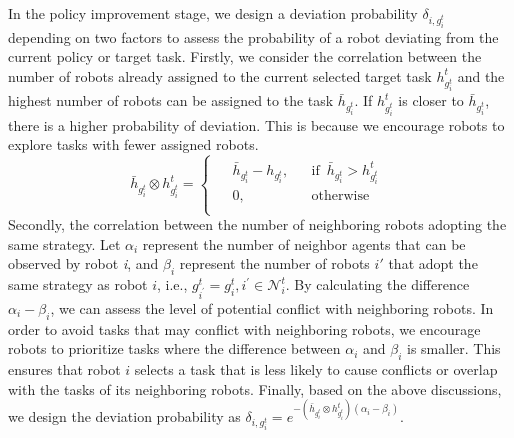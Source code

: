 \documentclass[lettersize,journal]{IEEEtran}
\begin{document}
In the policy improvement stage, we design a deviation probability $\delta_{i,g_i^t}$  depending on two factors to assess the probability of a robot deviating from the current policy or target task. 
  Firstly, we consider the correlation between the number of robots already assigned to the current selected target task $h_{g_i^t}^t$ and the highest number of robots can be assigned to the task $\bar{h}_{g_i^t}$. If $h_{g_i^t}^t$ is closer to $\bar{h}_{g_i^t}$, there is a higher probability of deviation. This is because we encourage robots to explore tasks with fewer assigned robots.
\begin{equation}
    \bar{h}_{g_i^t}\otimes h_{g_i^t}^t=
    \begin{cases}
        \begin{aligned}
            &\bar{h}_{g_i^t}-h_{g_i^t}, && \text{if}\enspace \bar{h}_{g_i^t}>h_{g_i^t}^t\\
            &0, && \text{otherwise}\\
        \end{aligned}\label{eq26}
    \end{cases}       
\end{equation}
Secondly, the correlation between the number of neighboring robots adopting the same strategy.  Let $\alpha_i$ represent the number of neighbor agents that can be observed by robot \textit{i}, and $\beta_i$ represent the number of robots $i'$ that adopt the same strategy as robot $i$, i.e., $g_{i^{\prime}}^{t}=g_{i}^{t},i^{\prime}\in \mathcal{N}_{i}^t$.  By calculating the difference $\alpha_i-\beta_i$, we can assess the level of potential conflict with neighboring robots. In order to avoid tasks that may conflict with neighboring robots, we encourage robots to prioritize tasks where the difference between $\alpha_i$ and $\beta_i$ is smaller. This ensures that robot $i$ selects a task that is less likely to cause conflicts or overlap with the tasks of its neighboring robots. 
Finally, based on the above discussions, we design the  deviation probability  as  $\delta_{i,g_i^t}=e^{-\left(\bar{h}_{g_i^t}\otimes h_{g_i^t}^t\right)(\alpha_i-\beta_i)}$. 

\begin{algorithm}[h]
\caption{Distributed Policy Improvements and Execution}\label{alg2}

\end{algorithm}
\end{document}
